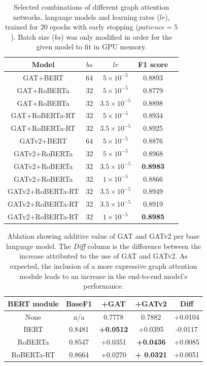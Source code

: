 \documentclass[letterpaper]{article} %
\begin{document}
\begin{table}
    \begin{tabular}{|c||c|c|c|c|}
        \hline
        Model & $bs$ & $lr$ & F1 score \\
        \hline 
        \hline
        GAT+BERT & 64 & $5\times10^{-5}$ &  0.8893 \\
        GAT+RoBERTa & 32 & $5\times10^{-5}$ &  0.8779 \\
        GAT+RoBERTa & 32 & $3.5\times10^{-5}$ &  0.8898 \\
        GAT+RoBERTa-RT & 32 & $5\times10^{-5}$  & 0.8934 \\
        GAT+RoBERTa-RT & 32 & $3.5\times10^{-5}$  & 0.8925 \\
        GATv2+BERT & 64 & $5\times10^{-5}$  & 0.8876 \\
        GATv2+RoBERTa & 32 & $5\times10^{-5}$ &  0.8968 \\
        GATv2+RoBERTa & 32 & $3.5\times10^{-5}$ &  \textbf{0.8983} \\
        GATv2+RoBERTa & 32 & $1\times10^{-5}$ &  0.8866 \\
        GATv2+RoBERTa-RT & 32 & $3.5\times10^{-5}$  & 0.8949 \\
        GATv2+RoBERTa-RT & 32 & $3.5\times10^{-5}$  & 0.8919 \\
        GATv2+RoBERTa-RT & 32 & $1\times10^{-5}$  & \textbf{0.8985} \\
        \hline
    \end{tabular}
    \caption{Selected combinations of different graph attention networks, language models and learning rates ($lr$), trained for 20 epochs with early stopping ($patience=5$). Batch size ($bs$) was only modified in order for the given model to fit in GPU memory.}
\end{table}


\begin{table}
    \begin{tabular}{|c||c|c|c|c|}
        \hline 
        BERT module & BaseF1 & +GAT & +GATv2 & Diff \\
        \hline
        \hline
        None & n/a & 0.7778 & 0.7882 & +0.0104 \\
        BERT & 0.8481 & \textbf{+0.0512} &  +0.0395  & -0.0117 \\
        RoBERTa & 0.8547 & +0.0351 & \textbf{+0.0436} & +0.0085 \\
        RoBERTa-RT & 0.8664 & +0.0270 & \textbf{+ 0.0321} & +0.0051 \\
        \hline
    \end{tabular}
    \caption{Ablation showing additive value of GAT and GATv2 per base language model. The \textit{Diff} column is the difference between the increase attributed to the use of GAT and GATv2. As expected, the inclusion of a more expressive graph attention module leads to an increase in the end-to-end model's performance. }
\end{table}
\end{document}
